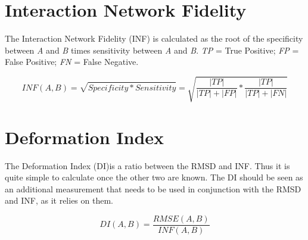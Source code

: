 \documentclass{article}
\begin{document}
\section{Interaction Network Fidelity}
The Interaction Network Fidelity (INF) is calculated as the root of the specificity between \textit{A} and \textit{B} times sensitivity between \textit{A} and \textit{B}. \textit{TP} = True Positive; \textit{FP} = False Positive; \textit{FN} = False Negative.

\begin{equation}
    \label{eq:inf}
    INF(A, B) = \sqrt{Specificity * Sensitivity} = \sqrt{\frac{|TP|}{|TP| + |FP|} * \frac{|TP|}{|TP| + |FN|}}
\end{equation}

\section{Deformation Index}
The Deformation Index (DI)is a ratio between the RMSD and INF. Thus it is quite simple to calculate once the other two are known. The DI should be seen as an additional measurement that needs to be used in conjunction with the RMSD and INF, as it relies on them.

\begin{equation}
    \label{eq:di}
    DI(A, B) = \frac{RMSE(A, B)}{INF(A, B)}
\end{equation}
\end{document}
